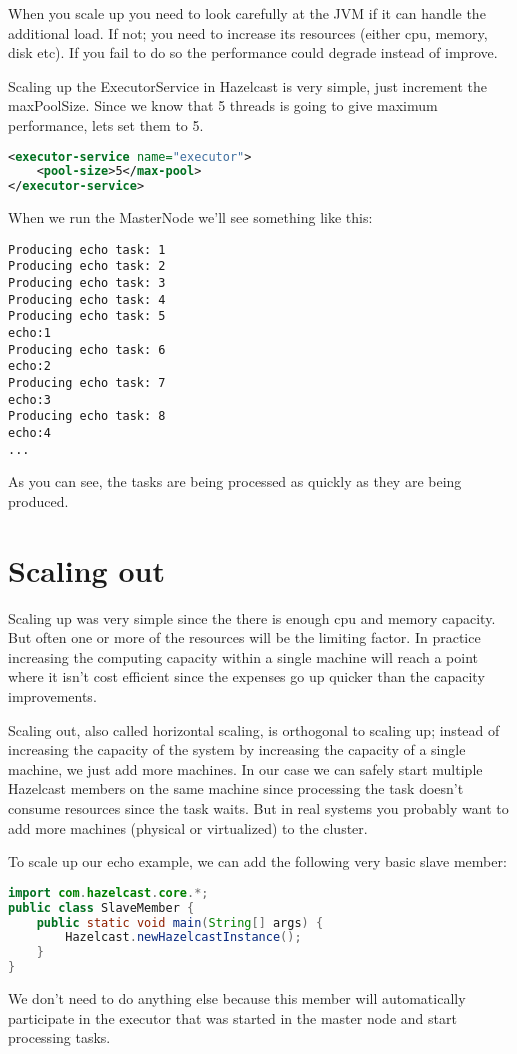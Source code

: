 When you scale up you need to look carefully at the JVM if it can handle the additional load. If not; you need to increase its resources (either cpu, memory, disk etc). If you fail to do so the performance could degrade instead of improve. 

Scaling up the ExecutorService in Hazelcast is very simple, just increment the maxPoolSize. Since we know that 5 threads is going to give maximum performance, lets set them to 5.
\begin{lstlisting}[language=xml]
<executor-service name="executor">
    <pool-size>5</max-pool>
</executor-service>
\end{lstlisting}
When we run the MasterNode we'll see something like this:
\begin{lstlisting}
Producing echo task: 1
Producing echo task: 2
Producing echo task: 3
Producing echo task: 4
Producing echo task: 5
echo:1
Producing echo task: 6
echo:2
Producing echo task: 7
echo:3
Producing echo task: 8
echo:4
...
\end{lstlisting}
As you can see, the tasks are being processed as quickly as they are being produced. 

\section{Scaling out}
Scaling up was very simple since the there is enough cpu and memory capacity. But often one or more of the resources will be the limiting factor. In practice increasing the computing capacity within a single machine will reach a point where it isn't cost efficient since the expenses go up quicker than the capacity improvements.

Scaling out, also called horizontal scaling, is orthogonal to scaling up; instead of increasing the capacity of the system by increasing the capacity of a single machine, we just add more machines. In our case we can safely start multiple Hazelcast members on the same machine since processing the task doesn't consume resources since the task waits. But in real systems you probably want to add more machines (physical or virtualized) to the cluster.

To scale up our echo example, we can add the following very basic slave member:
\begin{lstlisting}[language=java]
import com.hazelcast.core.*;
public class SlaveMember {
    public static void main(String[] args) {
        Hazelcast.newHazelcastInstance();
    }
}
\end{lstlisting}
We don't need to do anything else because this member will automatically participate in the executor that was started in the master node and start processing tasks. 

